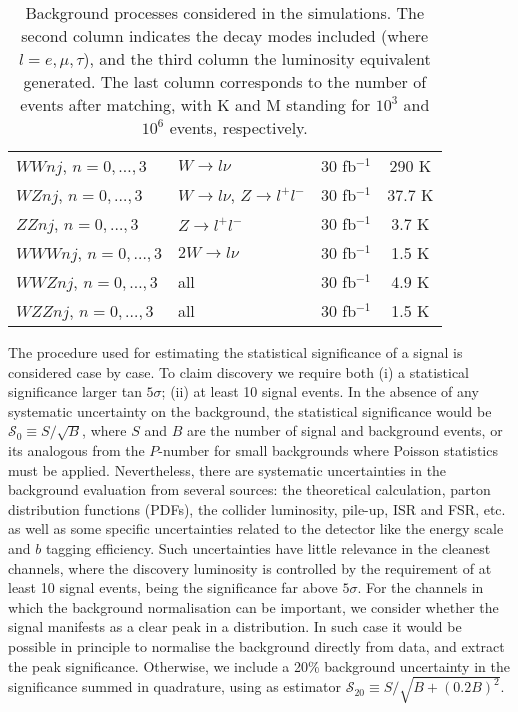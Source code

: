 \documentclass[12pt,a4paper]{article}
\begin{document}
\begin{table}[t]
\begin{center}
\begin{small}
\begin{tabular}{llcc}
$WWnj$, $n=0,\dots,3$          & $W \to l \nu$       & 30 fb$^{-1}$   & 290 K \\
$WZnj$, $n=0,\dots,3$          & $W \to l \nu$, $Z \to l^+ l^-$
                                                       & 30 fb$^{-1}$   & 37.7 K \\
$ZZnj$,  $n=0,\dots,3$          & $Z \to l^+ l^-$  & 30 fb$^{-1}$   & 3.7 K \\
$WWWnj$, $n=0,\dots,3$         & $2W \to l \nu$      & 30 fb$^{-1}$   & 1.5 K \\
$WWZnj$, $n=0,\dots,3$         & all                    & 30 fb$^{-1}$   & 4.9 K \\
$WZZnj$, $n=0,\dots,3$         & all                    & 30 fb$^{-1}$   & 1.5 K
\end{tabular}
\end{small}
\caption{Background processes considered in the simulations. The second column indicates the decay modes included (where $l=e,\mu,\tau$), and the third column the luminosity equivalent generated. The last column corresponds to the number of events after matching, with K and M standing for $10^3$ and $10^6$ events, respectively.}
\label{tab:allbkg}
\end{center}
\end{table}

The procedure used for estimating the statistical significance of a signal is considered case by case. To claim discovery we require both (i) a statistical significance larger tan $5\sigma$; (ii) at least 10 signal events. 
In the absence of any systematic uncertainty on the background, the statistical significance would be $\mathcal{S}_0 \equiv S/\sqrt B$, where $S$ and $B$ are the number of signal and background events, or its analogous from the $P$-number for small backgrounds where Poisson statistics must be applied. Nevertheless, there are systematic uncertainties in the background evaluation from several sources: the theoretical calculation, parton distribution functions (PDFs), the collider luminosity, pile-up, ISR and FSR, etc. as well as some specific uncertainties related to the detector like the energy scale and $b$ tagging efficiency. Such uncertainties have little relevance in the cleanest channels, where the discovery luminosity is controlled by the requirement of at least 10 signal events, being the significance far above $5\sigma$. For the channels in which the background normalisation can be important, we consider whether the signal manifests as a clear peak in a distribution. In such case it would be possible in principle to normalise the background directly from data, and extract the peak significance. Otherwise, we include a 20\% background uncertainty in the significance summed in quadrature, using as estimator $\mathcal{S}_{20} \equiv S/\sqrt{B+(0.2 B)^2}$.
\end{document}
